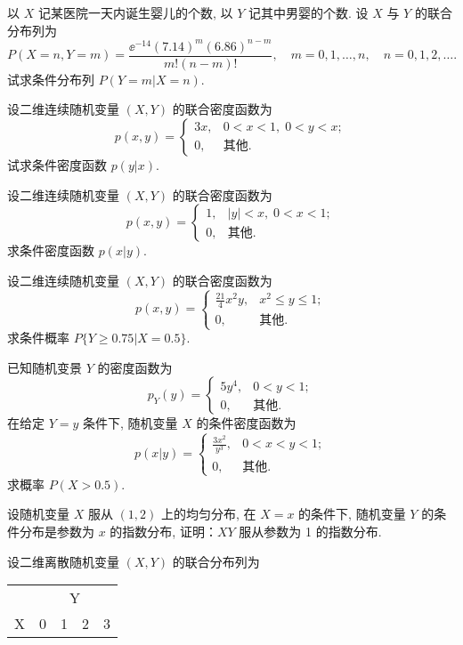 	\begin{xiti}
		\item 	以 $X$ 记某医院一天内诞生婴儿的个数, 以 $Y$ 记其中男婴的个数. 设 $X$ 与 $Y$ 的联合分布列为
		\[
			P(X=n, Y=m)=\frac{\ee^{-14}(7.14)^{m}(6.86)^{n-m}}{m !(n-m) !}, \quad m=0,1, \ldots, n, \quad n=0,1,2, \ldots.
			\]
			试求条件分布列 $P(Y=m|X=n)$.
		\item 设二维连续随机变量 $(X,Y)$ 的联合密度函数为
		\[
			p(x, y)=\begin{cases}3 x, & 0<x<1,\; 0<y<x; \\
			 0, & 	\text{其他}.\end{cases}\]
			 试求条件密度函数 $p(y|x)$.
		\item 设二维连续随机变量 $(X,Y)$ 的联合密度函数为
		\[
		p(x, y)=\begin{cases}1, & |y|<x,\;0<x<1; \\
		   0,& \text{其他}.\end{cases}
		   \]
		   求条件密度函数 $p(x|y)$.
		\item 设二维连续随机变量 $(X,Y)$ 的联合密度函数为
		   \[
			   p(x,y)=\begin{cases}
				   \frac{21}{4}x^2 y, &	x^2\leq y \leq 1;\\
				   0,	&	\text{其他}.
			   \end{cases}\]
			   求条件概率 $P\{Y\geq 0.75|X=0.5\}$.
		\item 已知随机变景 $Y$ 的密度函数为
			\[
				p_Y(y)=\begin{cases}
					5y^4,&	0<y<1;\\
					0,&		\text{其他}.
				\end{cases}\]
				在给定 $Y=y$ 条件下, 随机变量 $X$ 的条件密度函数为
			\[
				p(x|y)=\begin{cases}
					\frac{3x^2}{y^3},&	0<x<y<1;\\
					0,&		\text{其他}.
				\end{cases}\]
			求概率 $P(X>0.5)$.
		\item 设随机变量 $X$ 服从 $(1,2)$ 上的均匀分布, 在 $X=x$ 的条件下, 随机变量 $Y$ 的条件分布是参数为 $x$
		的指数分布, 证明：$XY$ 服从参数为 1 的指数分布.
		\item 设二维离散随机变量 $(X,Y)$ 的联合分布列为
			\begin{center}
				\begin{tabularx}{0.8\textwidth}{YYYYY}
					\toprule
					&  \\
				  X     & 0     & 1     & 2     & 3 \\

\end{tabularx}
\end{center}
\end{xiti}
